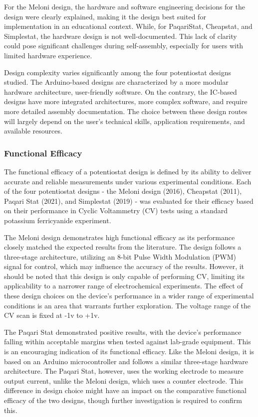 \documentclass{article}
\begin{document}
For the Meloni design, the hardware and software engineering decisions for the design were clearly explained, making it the design best suited for implementation in an educational context. While, for PaqariStat, Cheapstat, and Simplestat, the hardware design is not well-documented. This lack of clarity could pose significant challenges during self-assembly, especially for users with limited hardware experience.


Design complexity varies significantly among the four potentiostat designs studied. The Arduino-based designs are characterized by a more modular hardware architecture, user-friendly software. On the contrary, the IC-based designs have more integrated architectures, more complex software, and require more detailed assembly documentation. The choice between these design routes will largely depend on the user's technical skills, application requirements, and available resources.


\subsubsection*{Functional Efficacy}
The functional efficacy of a potentiostat design is defined by its ability to deliver accurate and reliable measurements under various experimental conditions. Each of the four potentiostat designs - the Meloni design (2016), Cheapstat (2011), Paqari Stat (2021), and Simplestat (2019) - was evaluated for their efficacy based on their performance in Cyclic Voltammetry (CV) tests using a standard potassium ferricyanide experiment.


The Meloni design demonstrates high functional efficacy as its performance closely matched the expected results from the literature. The design follows a three-stage architecture, utilizing an 8-bit Pulse Width Modulation (PWM) signal for control, which may influence the accuracy of the results. However, it should be noted that this design is only capable of performing CV, limiting its applicability to a narrower range of electrochemical experiments. The effect of these design choices on the device's performance in a wider range of experimental conditions is an area that warrants further exploration. The voltage range of the CV scan is fixed at -1v to +1v.


The Paqari Stat demonstrated positive results, with the device's performance falling within acceptable margins when tested against lab-grade equipment. This is an encouraging indication of its functional efficacy. Like the Meloni design, it is based on an Arduino microcontroller and follows a similar three-stage hardware architecture. The Paqari Stat, however, uses the working electrode to measure output current, unlike the Meloni design, which uses a counter electrode. This difference in design choice might have an impact on the comparative functional efficacy of the two designs, though further investigation is required to confirm this.
\end{document}
